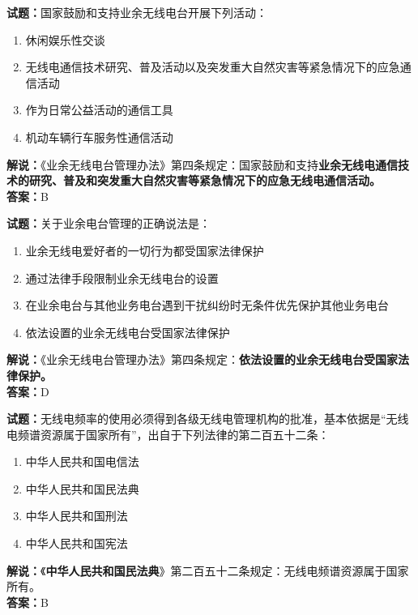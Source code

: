 \documentclass{ctexbook}
\begin{document}
\bigskip




\noindent\textbf{试题：}国家鼓励和支持业余无线电台开展下列活动：
\begin{enumerate}[leftmargin=3em]
\item 休闲娱乐性交谈
\item 无线电通信技术研究、普及活动以及突发重大自然灾害等紧急情况下的应急通信活动
\item 作为日常公益活动的通信工具
\item 机动车辆行车服务性通信活动
\end{enumerate}
\noindent\textbf{解说：}《业余无线电台管理办法》第四条规定：国家鼓励和支持\textbf{业余无线电通信技术的研究、普及和突发重大自然灾害等紧急情况下的应急无线电通信活动。}\\\noindent\textbf{答案：}B

\bigskip




\noindent\textbf{试题：}关于业余电台管理的正确说法是：
\begin{enumerate}[leftmargin=3em]
\item 业余无线电爱好者的一切行为都受国家法律保护
\item 通过法律手段限制业余无线电台的设置
\item 在业余电台与其他业务电台遇到干扰纠纷时无条件优先保护其他业务电台
\item 依法设置的业余无线电台受国家法律保护
\end{enumerate}
\noindent\textbf{解说：}《业余无线电台管理办法》第四条规定：\textbf{依法设置的业余无线电台受国家法律保护。}\\\noindent\textbf{答案：}D

\bigskip



\noindent\textbf{试题：}无线电频率的使用必须得到各级无线电管理机构的批准，基本依据是“无线电频谱资源属于国家所有”，出自于下列法律的第二百五十二条：
\begin{enumerate}[leftmargin=3em]
\item 中华人民共和国电信法
\item 中华人民共和国民法典
\item 中华人民共和国刑法
\item 中华人民共和国宪法
\end{enumerate}
\noindent\textbf{解说：}《\textbf{中华人民共和国民法典}》第二百五十二条规定：无线电频谱资源属于国家所有。\\\noindent\textbf{答案：}B
\end{document}
